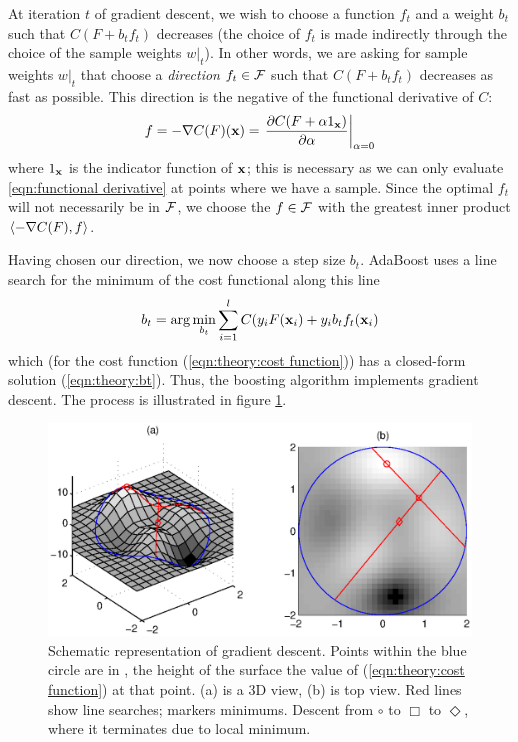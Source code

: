 At iteration $t$ of gradient descent, we wish to choose a function $f_t$ and
a weight $b_t$ such that $C(F + b_t f_t)$ decreases (the choice of
$f_t$ is made indirectly through the choice of the sample weights
$w|_t$).  In other words, we are asking for sample weights $w|_t$ that
choose a \emph{direction} $f_t \in \mathcal{F}$ such that $C(F + b_t f_t)$
decreases as fast as possible.  This direction is the negative of the
functional derivative of $C$:
%
\begin{equation}
f = -\nabla C(F)(\mathbf{x}) = \left. \frac{\partial C(F + \alpha
1_{\mathbf{x}})}{\partial \alpha} \right|_{\alpha = 0}
\label{eqn:functional derivative}
\end{equation}
%
where $1_{\mathbf{x}}$ is the indicator function of $\mathbf{x}$; this is
necessary as we can only evaluate \ref{eqn:functional derivative} at
points where we have a sample.  Since the
optimal $f_t$ will not necessarily be in $\mathcal{F}$, we choose the
$f \in \mathcal{F}$ with the greatest inner product $\langle {-\nabla
C(F)} , {f} \rangle$.

Having chosen our direction, we now choose a step size $b_t$.
AdaBoost uses a line search for the minimum of the cost functional
along this line
%
\begin{equation}
b_t = \arg \min_{b_t} \sum_{i=1}^{l} C(y_i F(\mathbf{x}_i) + y_i b_t f_t(\mathbf{x}_i)
\end{equation}
%
which (for the cost function (\ref{eqn:theory:cost
function})) has a closed-form solution  (\ref{eqn:theory:bt}).  Thus, the
boosting algorithm implements gradient descent.  The process is
illustrated in figure \ref{fig:gradient descent}.

\begin{figure}
\begin{center}
\includegraphics{figures/descent.eps}
\caption{Schematic representation of gradient descent.  Points within the blue
circle are in \calF, the height of the surface the value of
(\ref{eqn:theory:cost function}) at that point.  (a) is a 3D view, (b)
is top view. Red lines show line searches; markers minimums.  Descent
from $\circ$ to $\Box$ to $\Diamond$, where it terminates due to
local minimum.}
\label{fig:gradient descent}
\end{center}
\end{figure}




